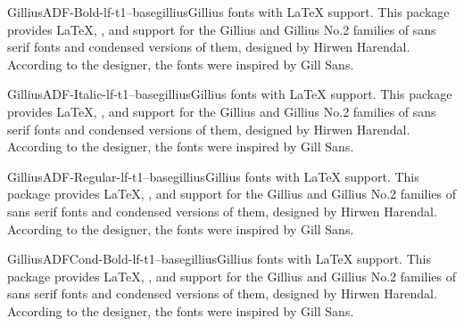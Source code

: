 \documentclass{ddltxtyp}
\begin{document}
\begin{package}{GilliusADF-Bold-lf-t1--base}{gillius}{Gillius fonts with {\LaTeX} support.}
This package provides {\LaTeX}, {\pdfLaTeX}, {\XeLaTeX} and {\LuaLaTeX}
support for the Gillius and Gillius No.2 families of sans
serif fonts and condensed versions of them, designed by Hirwen
Harendal. According to the designer, the fonts were inspired by
Gill Sans.
\end{package}


\begin{package}{GilliusADF-Italic-lf-t1--base}{gillius}{Gillius fonts with {\LaTeX} support.}
This package provides {\LaTeX}, {\pdfLaTeX}, {\XeLaTeX} and {\LuaLaTeX}
support for the Gillius and Gillius No.2 families of sans
serif fonts and condensed versions of them, designed by Hirwen
Harendal. According to the designer, the fonts were inspired by
Gill Sans.
\end{package}

\begin{package}{GilliusADF-Regular-lf-t1--base}{gillius}{Gillius fonts with {\LaTeX} support.}
This package provides {\LaTeX}, {\pdfLaTeX}, {\XeLaTeX} and {\LuaLaTeX}
support for the Gillius and Gillius No.2 families of sans
serif fonts and condensed versions of them, designed by Hirwen
Harendal. According to the designer, the fonts were inspired by
Gill Sans.
\end{package}

\begin{package}{GilliusADFCond-Bold-lf-t1--base}{gillius}{Gillius fonts with {\LaTeX} support.}
This package provides {\LaTeX}, {\pdfLaTeX}, {\XeLaTeX} and {\LuaLaTeX}
support for the Gillius and Gillius No.2 families of sans
serif fonts and condensed versions of them, designed by Hirwen
Harendal. According to the designer, the fonts were inspired by
Gill Sans.
\end{package}

\end{document}
